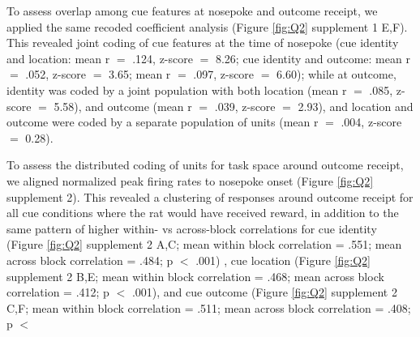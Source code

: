 \documentclass[11pt]{article}
\providecommand{\DIFadd}[1]{{\protect\color{red} \sf #1}} %
\providecommand{\DIFdel}[1]{} %
\providecommand{\DIFaddbegin}{} %
\providecommand{\DIFaddend}{} %
\providecommand{\DIFdelbegin}{} %
\providecommand{\DIFdelend}{} %
\newcommand{\DIFscaledelfig}{0.5}
\newlength{\DIFdelgraphicswidth} %
\newlength{\DIFdelgraphicsheight} %
\newcommand{\DIFaddincludegraphics}[2][]{{\color{red}\fbox{\DIFOincludegraphics[#1]{#2}}}} %
\newcommand{\DIFdelincludegraphics}[2][]{%
\sbox{\DIFdelgraphicsbox}{\DIFOincludegraphics[#1]{#2}}%
\settoboxwidth{\DIFdelgraphicswidth}{\DIFdelgraphicsbox} %
\settoboxtotalheight{\DIFdelgraphicsheight}{\DIFdelgraphicsbox} %
\scalebox{\DIFscaledelfig}{%
\parbox[b]{\DIFdelgraphicswidth}{\usebox{\DIFdelgraphicsbox}\\[-\baselineskip] \rule{\DIFdelgraphicswidth}{0em}}\llap{\resizebox{\DIFdelgraphicswidth}{\DIFdelgraphicsheight}{%
\setlength{\unitlength}{\DIFdelgraphicswidth}%
\begin{picture}(1,1)%
\thicklines\linethickness{2pt} %
{\color[rgb]{1,0,0}\put(0,0){\framebox(1,1){}}}%
{\color[rgb]{1,0,0}\put(0,0){\line( 1,1){1}}}%
{\color[rgb]{1,0,0}\put(0,1){\line(1,-1){1}}}%
\end{picture}%
}\hspace*{3pt}}} %
} %
\DeclareRobustCommand{\DIFaddbegin}{\DIFOaddbegin \let\includegraphics\DIFaddincludegraphics} %
\DeclareRobustCommand{\DIFaddend}{\DIFOaddend \let\includegraphics\DIFOincludegraphics} %
\DeclareRobustCommand{\DIFdelbegin}{\DIFOdelbegin \let\includegraphics\DIFdelincludegraphics} %
\DeclareRobustCommand{\DIFdelend}{\DIFOaddend \let\includegraphics\DIFOincludegraphics} %
\begin{document}
\DIFadd{To assess  overlap among cue features at nosepoke and outcome receipt, we applied the same recoded coefficient analysis (Figure \ref{fig:Q2} supplement 1 E,F). This revealed joint coding of cue features at the time of nosepoke (cue identity and location: mean r $=$ .124, z-score $=$ 8.26; cue identity and outcome: mean r $=$ .052, z-score $=$ 3.65; mean r $=$ .097, z-score $=$ 6.60); while at outcome, identity was coded by a joint population with both location (mean r $=$ .085, z-score $=$ 5.58), and outcome (mean r $=$ .039, z-score $=$ 2.93), and location and outcome were coded by a separate population of units (mean r $=$ .004, z-score $=$ 0.28). 
}

\DIFadd{To assess the distributed coding of units for task space around outcome receipt, we aligned }\DIFaddend normalized peak firing rates to nosepoke onset \DIFdelbegin \DIFdel{, }\DIFdelend \DIFaddbegin \DIFadd{(Figure \ref{fig:Q2} supplement 2). This }\DIFaddend revealed a clustering of responses around outcome receipt for all cue conditions where the rat would have received reward\DIFdelbegin \DIFdel{(Figure \ref{fig:NP_tiling})}\DIFdelend , in addition to the same \DIFdelbegin \DIFdel{trend }\DIFdelend \DIFaddbegin \DIFadd{pattern }\DIFaddend of higher within- vs across-block correlations for cue identity (Figure \DIFdelbegin \DIFdel{\ref{fig:NP_tiling}}\DIFdelend \DIFaddbegin \DIFadd{\ref{fig:Q2} supplement 2 }\DIFaddend A,C; \DIFdelbegin \DIFdel{within block correlations }\DIFdelend \DIFaddbegin \DIFadd{mean within block correlation }\DIFaddend = \DIFdelbegin \DIFdel{.560 (light), .541 (sound); across block correlations }\DIFdelend \DIFaddbegin \DIFadd{.551; mean across block correlation }\DIFaddend = \DIFdelbegin \DIFdel{.487, .481, .483, .486; within block vs. within block comparison = p $=$ .112; within block vs. across block comparisons = }\DIFdelend \DIFaddbegin \DIFadd{.484; }\DIFaddend p $<$ .001)\DIFdelbegin \DIFdel{and }\DIFdelend \DIFaddbegin \DIFadd{, }\DIFaddend cue location (Figure \DIFdelbegin \DIFdel{\ref{fig:NP_tiling}}\DIFdelend \DIFaddbegin \DIFadd{\ref{fig:Q2} supplement 2 }\DIFaddend B,E; \DIFdelbegin \DIFdel{within block correlations }\DIFdelend \DIFaddbegin \DIFadd{mean within block correlation }\DIFaddend = \DIFdelbegin \DIFdel{.474 (arm 1), .461 (arm 2); across block correlations }\DIFdelend \DIFaddbegin \DIFadd{.468; mean across block correlation }\DIFaddend = \DIFdelbegin \DIFdel{.416, .402, .416, .415; within block vs. within block comparison = p $=$ .810; within block vs. across block comparisons = }\DIFdelend \DIFaddbegin \DIFadd{.412; }\DIFaddend p $<$ .001), \DIFdelbegin \DIFdel{but not }\DIFdelend \DIFaddbegin \DIFadd{and }\DIFaddend cue outcome (Figure \DIFdelbegin \DIFdel{\ref{fig:NP_tiling}}\DIFdelend \DIFaddbegin \DIFadd{\ref{fig:Q2} supplement 2 }\DIFaddend C,F; \DIFdelbegin \DIFdel{within block correlations }\DIFdelend \DIFaddbegin \DIFadd{mean within block correlation }\DIFaddend = \DIFdelbegin \DIFdel{.620 (reward-available), .401 (reward-unavailable); across block correlations }\DIFdelend \DIFaddbegin \DIFadd{.511; mean across block correlation }\DIFaddend = \DIFdelbegin \DIFdel{.418, .414, .390, }\DIFdelend .408; \DIFdelbegin \DIFdel{within block vs. within block comparison = }\DIFdelend p $<$ 
\end{document}
